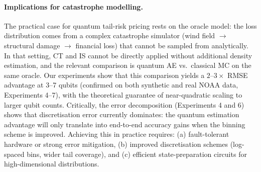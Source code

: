 \documentclass[11pt,a4paper]{article}
\begin{document}
\paragraph{Implications for catastrophe modelling.} The practical case for quantum tail-risk pricing rests on the oracle model: the loss distribution comes from a complex catastrophe simulator (wind field $\to$ structural damage $\to$ financial loss) that cannot be sampled from analytically. In that setting, CT and IS cannot be directly applied without additional density estimation, and the relevant comparison is quantum AE vs.\ classical MC on the same oracle. Our experiments show that this comparison yields a $2$--$3\times$ RMSE advantage at 3--7 qubits (confirmed on both synthetic and real NOAA data, Experiments 4--7), with the theoretical guarantee of near-quadratic scaling to larger qubit counts. Critically, the error decomposition (Experiments 4 and 6) shows that discretisation error currently dominates: the quantum estimation advantage will only translate into end-to-end accuracy gains when the binning scheme is improved. Achieving this in practice requires: (a) fault-tolerant hardware or strong error mitigation, (b) improved discretisation schemes (log-spaced bins, wider tail coverage), and (c) efficient state-preparation circuits for high-dimensional distributions.
\end{document}
